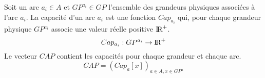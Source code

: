 Soit un arc $a_{i} \in A$ et $GP^{a_{i}} \in GP$ l'ensemble des grandeurs physiques associ\'ees \`a l'arc  $a_{i}$.
La  capacit\'e d'un arc $a_{i}$ est une fonction $Cap_{a_{i}}$ qui, pour chaque grandeur physique $GP^{a_{i}}$ associe une valeur r\'eelle positive $\mbox{I\hspace{-.15em}R}^{+}$.
\begin{equation}
	Cap_{a_{i}}: GP^{a_{i}} \rightarrow \mbox{I\hspace{-.15em}R}^{+}
\end{equation}
Le  vecteur $CAP$ contient les capacit\'es pour chaque grandeur et chaque arc.
\begin{equation}
	CAP = (Cap_{a}[x])_{ a \in A, x \in GP^{a} }
\end{equation}